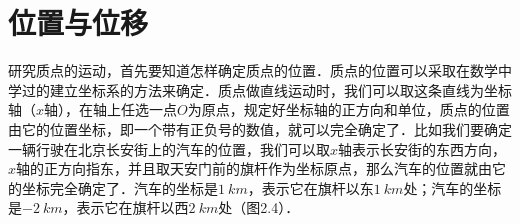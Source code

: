 \newpage

\section{位置与位移}

研究质点的运动，首先要知道怎样确定质点的位置．质点的位置可以采取在数学中学过的建立坐标系的方法来确定．质点做直线运动时，我们可以取这条直线为坐标轴（$x$轴），在轴上任选一点$O$为原点，规定好坐标轴的正方向和单位，质点的位置由它的位置坐标，即一个带有正负号的数值，就可以完全确定了．比如我们要确定一辆行驶在北京长安街上的汽车的位置，我们可以取$x$轴表示长安街的东西方向，$x$轴的正方向指东，并且取天安门前的旗杆作为坐标原点，那么汽车的位置就由它的坐标完全确定了．汽车的坐标是$\qty{1}{km}$，表示它在旗杆以东$\qty{1}{km}$处；汽车的坐标是$\qty{-2}{km}$，表示它在旗杆以西$\qty{2}{km}$处（图2.4）．
\begin{figure}[H]
    \centering
\end{figure}
